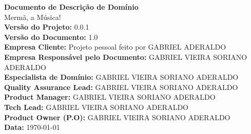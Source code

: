 \begin{titlepage}
    \centering
    \vfill
    {\Huge \textbf{Documento de Descrição de Domínio}}\\[1.5cm]
    {\Large Mermã, a Música!}\\[1cm]
    \textbf{Versão do Projeto:} 0.0.1\\
    \textbf{Versão do Documento:} 1.0\\[1cm]
    \textbf{Empresa Cliente:} Projeto pessoal feito por GABRIEL ADERALDO\\
    \textbf{Empresa Responsável pelo Documento:} GABRIEL VIEIRA SORIANO ADERALDO\\[1cm]
    \textbf{Especialista de Domínio:} GABRIEL VIEIRA SORIANO ADERALDO\\
    \textbf{Quality Assurance Lead:} GABRIEL VIEIRA SORIANO ADERALDO\\
    \textbf{Product Manager:} GABRIEL VIEIRA SORIANO ADERALDO\\
    \textbf{Tech Lead:} GABRIEL VIEIRA SORIANO ADERALDO\\
    \textbf{Product Owner (P.O):} GABRIEL VIEIRA SORIANO ADERALDO\\[2cm]
    \textbf{Data:} \today\\
    \vfill
\end{titlepage}
